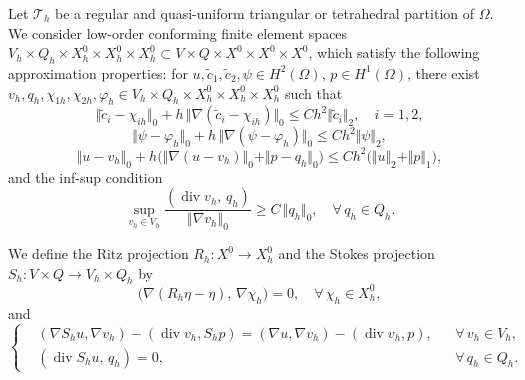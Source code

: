 Let $\mathcal{T}_{h}$ be a regular and quasi-uniform triangular or
tetrahedral partition of $\Omega$. We consider low-order conforming finite
element spaces
$V_{h}\times Q_{h}\times X^{0}_{h}\times X^{0}_{h}\times X^{0}_{h}
\subset V\times Q\times X^{0}\times X^{0}\times X^{0}$,
which satisfy the following approximation properties: for
$u,\tilde{c}_{1},\tilde{c}_{2},\psi\in H^{2}(\Omega)$,
$p\in H^{1}(\Omega)$, there exist
$v_{h},q_{h},\chi_{1h},\chi_{2h},\varphi_{h}
\in V_{h}\times Q_{h}\times X^{0}_{h}\times X^{0}_{h}\times X^{0}_{h}$
such that
\begin{equation}
  \Vert\tilde{c}_{i}-\chi_{ih}\Vert_{0}
  + h\,\Vert\nabla(\tilde{c}_{i}-\chi_{ih})\Vert_{0}
  \le Ch^{2}\Vert\tilde{c}_{i}\Vert_{2},
  \quad i=1,2,
  \label{eq:approx-c}
\end{equation}
\begin{equation}
  \Vert\psi-\varphi_{h}\Vert_{0}
  + h\,\Vert\nabla(\psi-\varphi_{h})\Vert_{0}
  \le Ch^{2}\Vert\psi\Vert_{2},
  \label{eq:approx-psi}
\end{equation}
\begin{equation}
  \Vert u-v_{h}\Vert_{0}
  + h\bigl(\Vert\nabla(u-v_{h})\Vert_{0}
         + \Vert p-q_{h}\Vert_{0}\bigr)
  \le Ch^{2}\bigl(\Vert u\Vert_{2}+\Vert p\Vert_{1}\bigr),
  \label{eq:approx-u}
\end{equation}
and the inf-sup condition \cite{John2016}
\begin{equation}
  \sup_{v_{h}\in V_{h}}
  \frac{(\operatorname{div}v_{h},\,q_{h})}{\Vert\nabla v_{h}\Vert_{0}}
  \ge C\,\Vert q_{h}\Vert_{0},
  \quad \forall\,q_{h}\in Q_{h}.
  \label{eq:infsup}
\end{equation}

We define the Ritz projection
$R_{h}:X^{0}\to X^{0}_{h}$ and the Stokes projection
$S_{h}:V\times Q\to V_{h}\times Q_{h}$ by
\begin{equation}
  \bigl(\nabla(R_{h}\eta-\eta),\,\nabla\chi_{h}\bigr) = 0,
  \quad \forall\,\chi_{h}\in X^{0}_{h},
  \label{eq:Ritz}
\end{equation}
and
\begin{equation}
  \left\{
  \begin{aligned}
    &(\nabla S_{h}u,\nabla v_{h}) - (\operatorname{div}v_{h},S_{h}p)
      = (\nabla u,\nabla v_{h}) - (\operatorname{div}v_{h},p),
      &&\forall\,v_{h}\in V_{h},\\
    &(\operatorname{div}S_{h}u,\,q_{h}) = 0,
      &&\forall\,q_{h}\in Q_{h}.
  \end{aligned}
  \right.
  \label{eq:Stokes-proj}
\end{equation}

